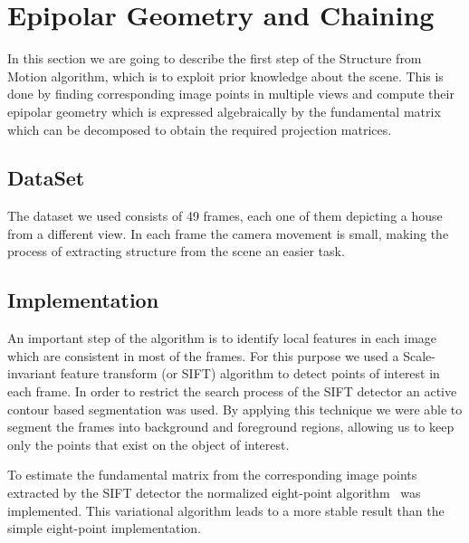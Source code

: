 \section{Epipolar Geometry and Chaining}
\label{egc}
In this section we are going to describe the first step of the Structure from Motion algorithm, which is to exploit prior knowledge about the scene. This is done by finding corresponding image points in multiple views and compute their epipolar geometry which is expressed algebraically by the fundamental matrix which can be decomposed to obtain the required projection matrices.

\subsection{DataSet}
The dataset we used consists of 49 frames, each one of them depicting a house from a different view. In each frame the camera movement is small, making the process of extracting structure from the scene an easier task.

\subsection{Implementation}
An important step of the algorithm is to identify local features in each image which are consistent in most of the frames. For this purpose we used a Scale-invariant feature transform (or SIFT) algorithm to detect points of interest in each frame. In order to restrict the search process of the SIFT detector an active contour based segmentation was used. By applying this technique we were able to segment the frames into background and foreground regions, allowing us to keep only the points that exist on the object of interest.

To estimate the fundamental matrix from the corresponding image points extracted by the SIFT detector the normalized eight-point algorithm~\cite{eight-point} was implemented. This variational algorithm leads to a more stable result than the simple eight-point implementation.  